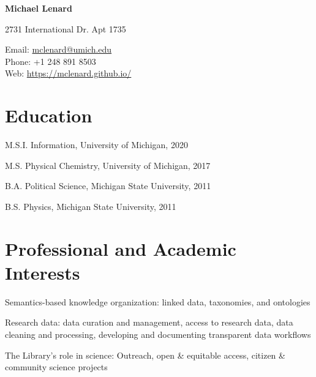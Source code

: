 \documentclass[12pt,letterpaper]{report}
\newcommand{\myname}{Michael Lenard}
\newcommand{\namefont}[1]{{\normalfont\bfseries\Huge{#1}}}
\newcommand{\listitemspace}{0.15em}
\renewenvironment{itemize}
{\begin{list}{}{\setlength{\leftmargin}{0em}
            \setlength{\parskip}{0em}
            \setlength{\itemsep}{\listitemspace}
            \setlength{\parsep}{\listitemspace}}}
    {\end{list}}
\begin{document}
    \raggedright

    \namefont{\myname}

    \vspace{1em}
    \begin{minipage}[t]{0.68\textwidth}
        2731 International Dr. Apt 1735 \\
    \end{minipage}
    \begin{minipage}[t]{0.31\textwidth}
        Email: \href{mailto:mclenard@umich.edu}{mclenard@umich.edu} \\
        Phone: +1 248 891 8503 \\
        Web: \href{https://mclenard.github.io/}{https://mclenard.github.io/}
    \end{minipage}
    \vspace{0.5em}



    \section*{Education}

    \begin{tablist}

        \item[M.S.I.] \tab Information, University of Michigan, 2020

        \item[M.S.]  \tab Physical Chemistry, University of Michigan, 2017

        \item[B.A.]  \tab Political Science, Michigan State University, 2011
        
        \item[B.S.]  \tab Physics, Michigan State University, 2011

    \end{tablist}



    \section*{Professional and Academic Interests}

    \begin{itemize}

        \item Semantics-based knowledge organization: linked data, taxonomies, and ontologies

        \item Research data: data curation and management, access to research data, data cleaning and processing, developing and documenting transparent data workflows

        \item The Library's role in science: Outreach, open & equitable access, citizen & community science projects

    \end{itemize}
\end{document}
